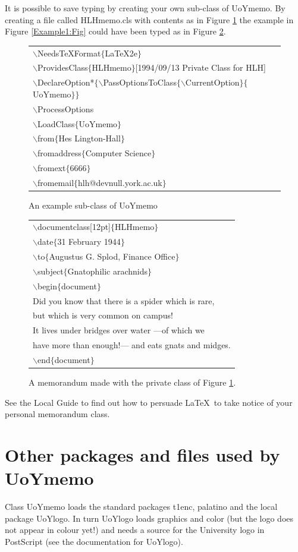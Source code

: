 \documentclass[12pt,a4paper]{article}
\newcommand{\cmdsty}[1]{\textsf{#1}}
\newcommand{\cmd}[1]{\cmdsty{$\backslash$#1}}
\newcommand{\pcmd}[2]{\cmdsty{\cmd{#1}$\{$#2$\}$}}
\begin{document}
It is possible to save typing by creating your own sub-class of
\cmdsty{UoYmemo}.  By creating a file called \cmdsty{HLHmemo.cls}
with contents as in Figure \ref{Cls:Fig} the example in Figure
\ref{Example1:Fig} could have been typed as in Figure
\ref{Example2:Fig}.
\begin{figure}[p]
{\sffamily
\begin{tabular}[t]{l}
\pcmd{NeedsTeXFormat}{LaTeX2e}\\
\pcmd{ProvidesClass}{HLHmemo}[1994/09/13 Private Class for HLH]\\
\pcmd{DeclareOption*}
        {\pcmd{PassOptionsToClass}{\cmd{CurrentOption}}$\{$UoYmemo$\}$}\\
\cmd{ProcessOptions}\\
\pcmd{LoadClass}{UoYmemo}\\
\pcmd{from}{Hes Lington-Hall}\\
\pcmd{fromaddress}{Computer Science}\\
\pcmd{fromext}{6666}\\
\pcmd{fromemail}{hlh@devnull.york.ac.uk}\\
\end{tabular}
}
\caption{An example sub-class of \cmdsty{UoYmemo}}\label{Cls:Fig}
\end{figure}
\begin{figure}[p]
{\sffamily
\begin{tabular}[t]{l}
\pcmd{documentclass[12pt]}{HLHmemo}\\
\pcmd{date}{31 February 1944}\\
\pcmd{to}{Augustus G. Splod, Finance Office}\\
\pcmd{subject}{Gnatophilic arachnids}\\
\pcmd{begin}{document}\\
Did you know that there is a spider which is rare,\\
but which is very common on campus!\\
It lives under bridges over water ---of which we\\
have more than enough!--- and eats gnats and midges.\\
\pcmd{end}{document}
\end{tabular}
}
\caption{A memorandum made with the private class of
                Figure \protect\ref{Cls:Fig}.}
\label{Example2:Fig}
\end{figure}

See the Local Guide to find out how to persuade \LaTeX\ to take notice
of your personal memorandum class.

\section{Other packages and files used by \cmdsty{UoYmemo}}

Class \cmdsty{UoYmemo} loads the standard packages
\cmdsty{t1enc}, \cmdsty{palatino} and the local package
\cmdsty{UoYlogo}.  In turn \cmdsty{UoYlogo} loads \cmdsty{graphics}
and \cmdsty{color} (but the logo does not appear in colour yet!) and
needs a source for the University logo in PostScript (see the
documentation for \cmdsty{UoYlogo}).
\end{document}
